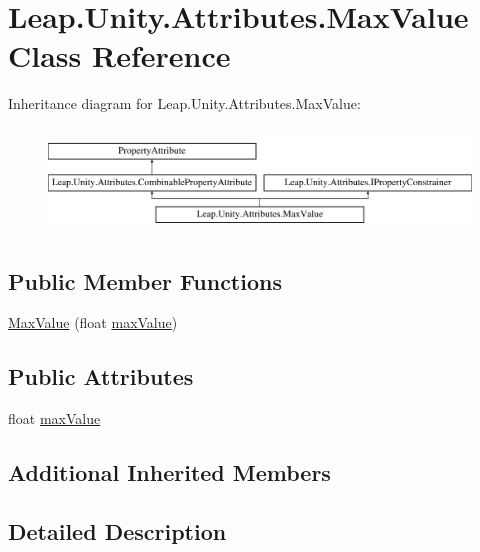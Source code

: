 \hypertarget{class_leap_1_1_unity_1_1_attributes_1_1_max_value}{}\section{Leap.\+Unity.\+Attributes.\+Max\+Value Class Reference}
\label{class_leap_1_1_unity_1_1_attributes_1_1_max_value}
Inheritance diagram for Leap.\+Unity.\+Attributes.\+Max\+Value\+:\begin{figure}[H]
\begin{center}
\leavevmode
\includegraphics[height=2.772277cm]{class_leap_1_1_unity_1_1_attributes_1_1_max_value}
\end{center}
\end{figure}
\subsection*{Public Member Functions}
\begin{DoxyCompactItemize}
\item 
\mbox{\hyperlink{class_leap_1_1_unity_1_1_attributes_1_1_max_value_a10106e003a1d79e9185a0c591f63efe8}{Max\+Value}} (float \mbox{\hyperlink{class_leap_1_1_unity_1_1_attributes_1_1_max_value_a24c71ceed3b711d05eb17b06395f22f2}{max\+Value}})
\end{DoxyCompactItemize}
\subsection*{Public Attributes}
\begin{DoxyCompactItemize}
\item 
float \mbox{\hyperlink{class_leap_1_1_unity_1_1_attributes_1_1_max_value_a24c71ceed3b711d05eb17b06395f22f2}{max\+Value}}
\end{DoxyCompactItemize}
\subsection*{Additional Inherited Members}


\subsection{Detailed Description}


